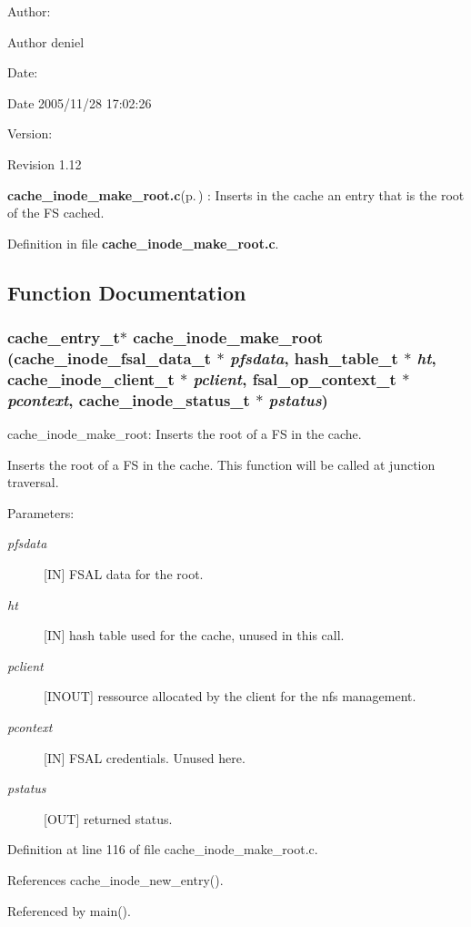 \begin{Desc}
\item[Author:]\begin{Desc}
\item[Author]deniel \end{Desc}
\end{Desc}
\begin{Desc}
\item[Date:]\begin{Desc}
\item[Date]2005/11/28 17:02:26 \end{Desc}
\end{Desc}
\begin{Desc}
\item[Version:]\begin{Desc}
\item[Revision]1.12 \end{Desc}
\end{Desc}
{\bf cache\_\-inode\_\-make\_\-root.c}{\rm (p.\,\pageref{cache__inode__make__root_8c})} : Inserts in the cache an entry that is the root of the FS cached.

Definition in file {\bf cache\_\-inode\_\-make\_\-root.c}.

\subsection{Function Documentation}
\subsubsection{\setlength{\rightskip}{0pt plus 5cm}cache\_\-entry\_\-t$\ast$ cache\_\-inode\_\-make\_\-root (cache\_\-inode\_\-fsal\_\-data\_\-t $\ast$ {\em pfsdata}, hash\_\-table\_\-t $\ast$ {\em ht}, cache\_\-inode\_\-client\_\-t $\ast$ {\em pclient}, fsal\_\-op\_\-context\_\-t $\ast$ {\em pcontext}, cache\_\-inode\_\-status\_\-t $\ast$ {\em pstatus})}\label{cache__inode__make__root_8c_a0}


cache\_\-inode\_\-make\_\-root: Inserts the root of a FS in the cache.

Inserts the root of a FS in the cache. This function will be called at junction traversal.

\begin{Desc}
\item[Parameters:]
\begin{description}
\item[{\em pfsdata}][IN] FSAL data for the root. \item[{\em ht}][IN] hash table used for the cache, unused in this call. \item[{\em pclient}][INOUT] ressource allocated by the client for the nfs management. \item[{\em pcontext}][IN] FSAL credentials. Unused here. \item[{\em pstatus}][OUT] returned status. \end{description}
\end{Desc}


Definition at line 116 of file cache\_\-inode\_\-make\_\-root.c.

References cache\_\-inode\_\-new\_\-entry().

Referenced by main().